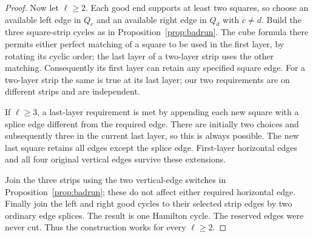 \documentclass[11pt]{article}
\theoremstyle{remark}
\numberwithin{equation}{section}
\numberwithin{table}{section}
\begin{document}
\begin{proof}
Now let $\ell\ge2$. Each good end supports at least two squares, so
choose an available left edge in $Q_c$ and an available right edge in
$Q_d$ with $c\ne d$. Build the three square-strip cycles as in
Proposition~\ref{prop:badrun}. The cube formula there permits either
perfect matching of a square to be used in the first layer, by rotating
its cyclic order; the last layer of a two-layer strip uses the other
matching. Consequently its first layer can retain any specified square
edge. For a two-layer strip the same is true at its last layer; our two
requirements are on different strips and are independent.

If $\ell\ge3$, a last-layer requirement is met by appending each new
square with a splice edge different from the required edge. There are
initially two choices and subsequently three in the current last
layer, so this is always possible. The new last square retains all
edges except the splice edge. First-layer horizontal edges and all
four original vertical edges survive these extensions.

Join the three strips using the two vertical-edge switches in
Proposition~\ref{prop:badrun}; these do not affect either required
horizontal edge. Finally join the left and right good cycles to their
selected strip edges by two ordinary edge splices. The result is one
Hamilton cycle. The reserved edges were never cut. Thus the construction
works for every $\ell\ge2$.
\end{proof}
\end{document}
